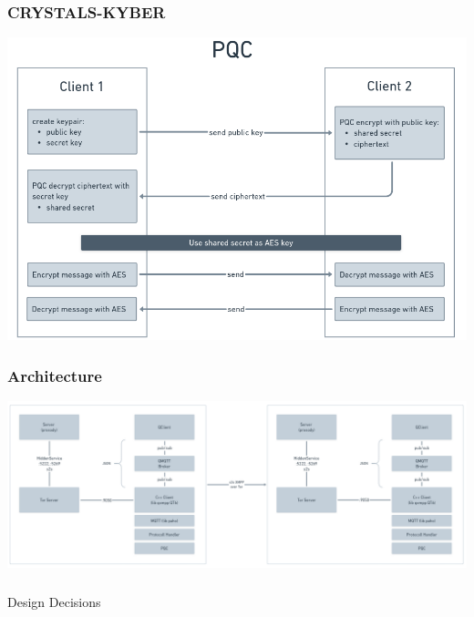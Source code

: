 \documentclass{beamer}
\begin{document}
\begin{frame}
	\frametitle{CRYSTALS-KYBER}
	\begin{center}
	\includegraphics[scale=0.29]{resources/PQC_Diagram.png}
	\end{center}
\end{frame}


\begin{frame}
	\frametitle{Architecture}
	\begin{center}
	\includegraphics[scale=0.26]{resources/architecture.png}
\end{center}
\end{frame}


\begin{frame}
    \frametitle{ }
    \centering
    \Huge Design Decisions
\end{frame}
\end{document}
